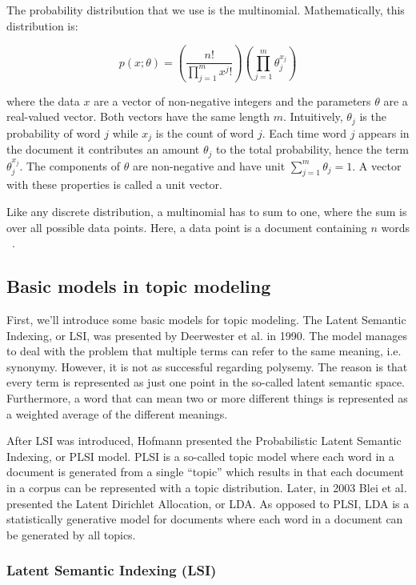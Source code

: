 \documentclass[12pt]{report}
\begin{document}
The probability distribution that we use is the multinomial. Mathematically,
this distribution is:

\begin{equation}
p(x;\theta) = \left(\frac{n!}{\prod\limits_{j=1}^m x^j!}\right)\left
(\prod\limits_{j=1}^m \theta_j^{x_j}\right)
\end{equation}

where the data $x$ are a vector of non-negative integers and the parameters
$\theta$ are a real-valued vector. Both vectors have the same length $m$.
Intuitively, $\theta_j$ is the probability of word $j$ while $x_j$ is the count
of word $j$. Each time word $j$ appears in the document it contributes an amount
$\theta_j$ to the total probability, hence the term $\theta_j^{x_j}$. The
components of $\theta$ are non-negative and have unit $\sum\limits_{j=1}^m
\theta_j = 1$. A vector with these properties is called a unit vector.

Like any discrete distribution, a multinomial has to sum to one, where the sum
is over all possible data points. Here, a data point is a document containing
$n$ words ~\cite{Huang_maximumlikelihood}.


\subsection{Basic models in topic modeling}

First, we’ll introduce some basic models for topic modeling. The Latent Semantic
Indexing, or LSI, was presented by Deerwester et al. in 1990. The model manages
to deal with the problem that multiple terms can refer to the same meaning,
i.e. synonymy. However, it is not as successful regarding polysemy. The reason
is that every term is represented as just one point in the so-called latent
semantic space. Furthermore, a word that can mean two or more different things
is represented as a weighted average of the different meanings.
 
After LSI was introduced, Hofmann presented the Probabilistic Latent Semantic
Indexing, or PLSI model. PLSI is a so-called topic model where each word in a
document is generated from a single “topic” which results in that each document
in a corpus can be represented with a topic distribution. Later, in 2003 Blei et
al. presented the Latent Dirichlet Allocation, or LDA. As opposed to PLSI, LDA
is a statistically generative model for documents where each word in a document
can be generated by all topics.

\subsubsection{Latent Semantic Indexing (LSI)}
\end{document}
